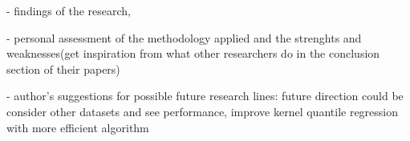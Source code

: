 - findings of the research,

- personal assessment of the methodology applied and the strenghts and weaknesses(get inspiration from what other researchers do in the conclusion section of their papers)

- author's suggestions for possible future research lines: future direction could be consider other datasets and see performance, improve kernel quantile regression with more efficient algorithm
